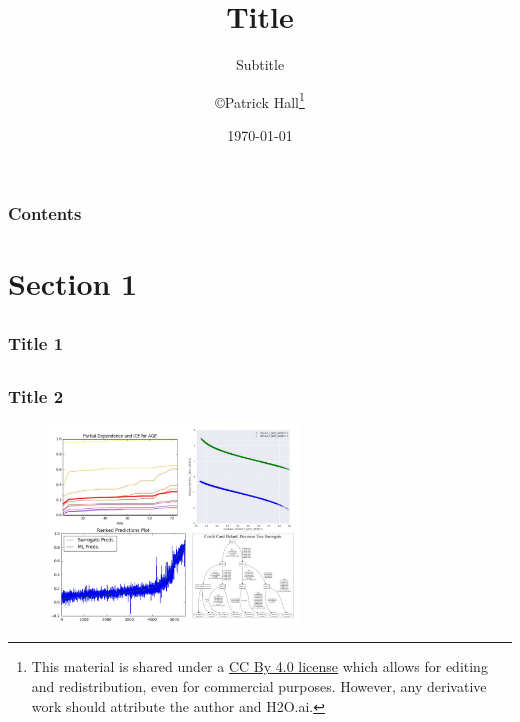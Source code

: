 \documentclass[11pt,
               		aspectratio=169,
               		hyperref={colorlinks}
               		]{beamer}
\author{\copyright\hspace{1pt}Patrick Hall\footnote{\tiny{This material is shared under a \href{https://creativecommons.org/licenses/by/4.0/deed.ast}{CC By 4.0 license} which allows for editing and redistribution, even for commercial purposes. However, any derivative work should attribute the author and H2O.ai.}}}
\title{Title}
\subtitle{\scriptsize{Subtitle}}
\institute{\href{https://www.h2o.ai}{H\textsubscript{2}O.ai}}
\date{\today}
\begin{document}
	
	\maketitle
	
	\begin{frame}
	
		\frametitle{Contents}
		
		\tableofcontents{}
		
	\end{frame}

	\section{Section 1}
	
		\subsection*{}
	
		\begin{frame}
		
			\frametitle{Title 1}			
					
			\blindtext \cite{esl}			
					
		\end{frame}					
		
		\subsection*{}
		
		\begin{frame}				
		
			\frametitle{Title 2}
							
			\begin{figure}[htb]
				\begin{center}
					\includegraphics[height=150pt]{img/dummy.jpg}
					\label{fig:blueprint}
				\end{center}
			\end{figure}		
		
		\end{frame}
		
\end{document}
